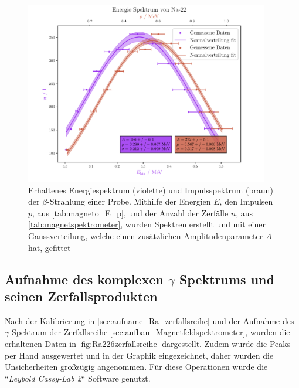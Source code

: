 \documentclass[12pt,english,ngerman]{scrartcl}
\begin{document}
\begin{figure}[H]
	\begin{center}
		\includegraphics[width = 0.95\textwidth]{figures/energiespektrum.pdf}
	\end{center}
	\caption[Energie- und Impulsspektogram der $\beta$-Strahlung einer
		 Probe]{Erhaltenes Energiespektrum (violette) und
		Impulsspektrum (braun) der $\beta$-Strahlung einer  Probe.
		Mithilfe der Energien $E$, den Impulsen $p$, aus
		\autoref{tab:magneto_E_p}, und der Anzahl der Zerfälle $n$, aus
		\autoref{tab:magnetspektrometer}, wurden Spektren erstellt und mit einer
		Gaussverteilung, welche einen zusätzlichen Amplitudenparameter $A$ hat,
		gefittet}\label{fig:magneto_E_p}
\end{figure}

\subsection{Aufnahme des komplexen \texorpdfstring{$\gamma$}{gamma} Spektrums
	und seinen Zerfallsprodukten}

Nach der Kalibrierung in \autoref{sec:aufname_Ra_zerfallsreihe} und der
Aufnahme des \(\gamma\)-Spektrum der  Zerfallsreihe
\autoref{sec:aufbau_Magnetfeldspektrometer}, wurden die erhaltenen Daten in
\autoref{fig:Ra226zerfallsreihe} dargestellt. Zudem wurde die Peaks per Hand
ausgewertet und in der Graphik eingezeichnet, daher wurden die Unsicherheiten
großzügig angenommen. Für diese Operationen wurde die ``\emph{Leybold Cassy-Lab
	2}`` Software genutzt.
\end{document}
